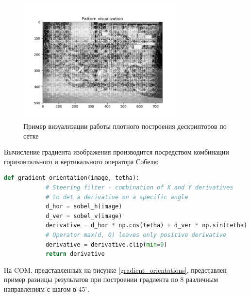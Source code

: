 {{{{{   		\begin{figure}[H]
   			\centering                             
   			\includegraphics[width=0.75\textwidth,keepaspectratio]{daisy/pattern_vis_dense.png}   
   			\centering\caption{ Пример визуализации работы плотного построения дескрипторов по сетке }
   			\label{pattern_visualisation_dense}                           
   		\end{figure}    
   		
   		Вычисление градиента изображения производится посредством комбинации горизонтального и вертикального оператора Собеля: 
   		
   		\begin{lstlisting}[frame=single,language=Python,mathescape=true] 
   		def gradient_orientation(image, tetha):
	   		# Steering filter - combination of X and Y derivatives 
	   		# to det a derivative on a specific angle
	   		d_hor = sobel_h(image)
	   		d_ver = sobel_v(image)
	   		derivative = d_hor * np.cos(tetha) + d_ver * np.sin(tetha)
	   		# Operator max(d, 0) leaves only positive derivative
	   		derivative = derivative.clip(min=0)
	   		return derivative
   		\end{lstlisting}
   		
   		На COM, представленных на рисунке \ref{gradient_orientations}, представлен пример разницы результатов при построении градиента по 8 различным направлениям с шагом в $45^{\circ}$.
   		
}}}}}
